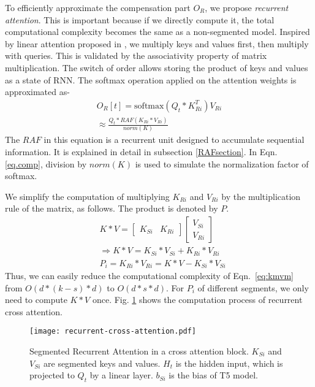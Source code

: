 \documentclass[11pt]{article}
\begin{document}
To efficiently approximate the compensation part $O_R$, we propose \textit{recurrent attention}. This is important because if we directly compute it, the total computational complexity becomes the same as a non-segmented model. Inspired by linear attention proposed in \citet{transformerRNN}, we multiply keys and values first, then multiply with queries. This is validated by the associativity property of matrix multiplication. The switch of order allows storing the product of keys and values as a state of RNN.  The softmax operation applied on the attention weights is approximated as-
\begin{align}
    O_R[t] = \text{softmax}(Q_t*K_{Ri}^T) V_{Ri} \\
  \label{eq.comp}  \approx   \frac{Q_t* RAF(K_{Ri} *V_{Ri})} {norm(K)}
\end{align} 
The $RAF$ in this equation is a recurrent unit  designed to accumulate sequential information. It is explained in detail in subsection \ref{RAFsection}. In Eqn. \ref{eq.comp}, division by $norm(K)$ is used to simulate the normalization factor of softmax. 


We simplify the computation of multiplying $K_{Ri}$ and $V_{Ri}$ by the multiplication rule of the matrix, as follows. The product is denoted by $P$.
\begin{align}
 &   K * V = \begin{bmatrix} K_{Si} & K_{Ri}
    \end{bmatrix} \begin{bmatrix} V_{Si} \\ V_{Ri} \end{bmatrix} 
   \\ &  \Rightarrow K * V =K_{Si}*V_{Si} + K_{Ri}*V_{Ri}\\ \label{eq:kmvm}
 &   P_i= K_{Ri} *V_{Ri} =  K * V -K_{Si}*V_{Si}
\end{align} 
Thus, we can easily reduce the computational complexity of Eqn.~\ref{eq:kmvm} from $O(d*(k-s)*d)$ to $O(d*s*d)$. For $P_i$ of different segments, we only need to compute $K*V$ once. Fig. \ref{fig:cross} shows the computation process of recurrent cross attention.

\begin{figure}
    \centering
    \texttt{[image: recurrent-cross-attention.pdf]}
    \caption{Segmented Recurrent Attention in a cross attention block. $K_{Si}$ and $V_{Si}$ are segmented keys and values. $H_t$ is the hidden input, which is projected to $Q_t$ by a linear layer. $b_{Si}$ is the bias of T5 model. }
    \label{fig:cross}
\end{figure}
\end{document}
